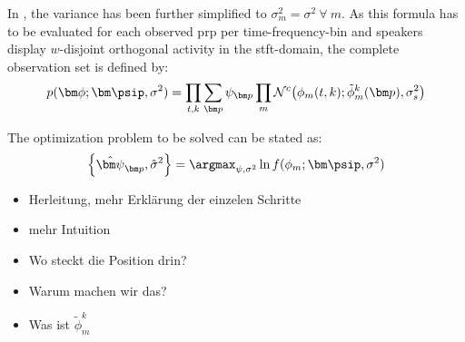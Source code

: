 In \cite{Schwartz2014}, the variance has been further simplified to $\sigma_{m}^2=\sigma^2\ \forall\ m$. As this formula has to be evaluated for each observed \gls{prp} per time-frequency-bin and speakers display $w$-disjoint orthogonal activity in the \gls{stft}-domain, the complete observation set is defined by:
\begin{equation}
    p(\bm\phi; \bm\psip,\sigma^2)=\prod_{t,k}\sum_{\bm p}\psi_{\bm p}\prod_m\mathcal{N}^c\big(\phi_m(t,k);\tilde\phi^k_m(\bm p),\sigma^2_{s}\big)
\end{equation}

The optimization problem to be solved can be stated as:
\begin{equation}
    \left\{\hat{\bm\psi}_{\bm p},\hat\sigma^2\right\}=\argmax_{\psi, \sigma^2}\ln f(\phi_m;\bm\psip,\sigma^2)
\label{eq:mle}
\end{equation}

\begin{itemize}
    \item Herleitung, mehr Erklärung der einzelen Schritte
    \item mehr Intuition
    \item Wo steckt die Position drin?
    \item Warum machen wir das?
    \item Was ist $\tilde\phi_m^k$
\end{itemize}
